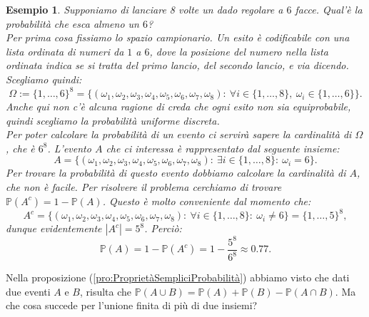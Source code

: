 \documentclass[11pt]{book}
\theoremstyle{Definizione}
\theoremstyle{TeoremaProposizioneLemmaCorollario}
\theoremstyle{OsservazioneNota}
\newtheorem{myes}{Esempio}[section]
\renewcommand{\P}{\mathbb{P}}
\begin{document}
\begin{myes}
Supponiamo di lanciare 8 volte un dado regolare a $6$ facce. Qual'è la probabilità che esca almeno un $6$?\\
Per prima cosa fissiamo lo spazio campionario. Un esito è codificabile con una lista ordinata di numeri da $1$ a $6$, dove la posizione del numero nella lista ordinata indica se si tratta del primo lancio, del secondo lancio, e via dicendo. Scegliamo quindi:
$$
\Omega:= \{1,\dots,6\}^8 = \{(\omega_1,\omega_2,\omega_3,\omega_4,\omega_5,\omega_6,\omega_7,\omega_8):\ \forall i\in \{1,\dots,8\},\ \omega_i\in \{1,\dots,6\}\}.
$$
Anche qui non c'è alcuna ragione di creda che ogni esito non sia equiprobabile, quindi scegliamo la probabilità uniforme discreta.\\
Per poter calcolare la probabilità di un evento ci servirà sapere la cardinalità di $\Omega$, che è $6^8$.
L'evento $A$ che ci interessa è rappresentato dal seguente insieme:
$$
A = \{(\omega_1,\omega_2,\omega_3,\omega_4,\omega_5,\omega_6,\omega_7,\omega_8):\ \exists i\in \{1,\dots,8\}:\ \omega_i = 6\}.
$$
Per trovare la probabilità di questo evento dobbiamo calcolare la cardinalità di $A$, che non è facile. Per risolvere il problema cerchiamo di trovare $\P(A^c) = 1-\P(A)$. Questo è molto conveniente dal momento che:
$$
A^c =  \{(\omega_1,\omega_2,\omega_3,\omega_4,\omega_5,\omega_6,\omega_7,\omega_8):\ \forall i\in \{1,\dots,8\}:\ \omega_i \neq 6\} = \{1,\dots,5\}^8,
$$
dunque evidentemente $|A^c| = 5^8$. Perciò:
$$
\P(A) = 1- \P(A^c) = 1 - \frac{5^8}{6^8} \approx 0.77.
$$
\end{myes}
Nella proposizione (\ref{pro:ProprietàSempliciProbabilità}) abbiamo visto che dati due eventi $A$ e $B$, risulta che $\P(A\cup B) = \P(A) +\P(B) -\P(A\cap B)$. Ma che cosa succede per l'unione finita di più di due insiemi?
\end{document}
